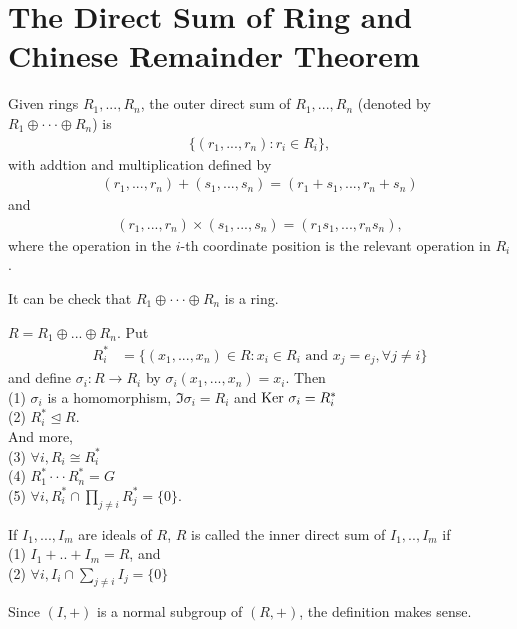 \chapter{The Direct Sum of Ring and Chinese Remainder Theorem}\label{chp:4_3}


\begin{definition}
    Given rings $R_1,...,R_n$, the outer direct sum of $R_1,...,R_n$ (denoted by $R_1\oplus\cdot\cdot\cdot\oplus R_n$) is
    \begin{align*}
        \{(r_1,...,r_n):r_i\in R_i\},
    \end{align*}
    with addtion and multiplication defined by 
    \begin{align*}
        (r_1,...,r_n) + (s_1,...,s_n) = (r_1+s_1,...,r_n+s_n)
    \end{align*}
    and 
    \begin{align*}
        (r_1,...,r_n)\times (s_1,...,s_n)=(r_1s_1,...,r_ns_n),
    \end{align*}
    where the operation in the $i$-th coordinate position is the relevant operation in $R_i$.
\end{definition}
It can be check that $R_1\oplus\cdot\cdot\cdot\oplus R_n$ is a ring.

\begin{theorem}{}{}
    $R = R_1\oplus ... \oplus R_n$. Put
    \begin{align*}
        R_i^* &= \{(x_1,...,x_n)\in R:x_i\in R_i\text{ and }x_j=e_j, \forall j\neq i\}
    \end{align*}
    and define $\sigma_i : R\rightarrow R_i$ by $\sigma_i(x_1,...,x_n)=x_i$. Then\\
    (1) $\sigma_i$ is a homomorphism, $\Im \sigma_i = R_i$ and $\text{Ker }\sigma_i = R_i^*$\\
    (2) $R_i^*\unlhd R$.\\
    And more, \\
    (3) $\forall i, R_i\cong R_i^*$\\
    (4) $R_1^*\cdot\cdot\cdot R_n^*=G$\\
    (5) $\forall i, R_i^*\cap \prod_{j\neq i}R_j^*=\{0\}$.
\end{theorem}

\begin{proposition}{}{}
    If $I_1,...,I_m$ are ideals of $R$, $R$ is called the inner direct sum of $I_1,..,I_m$ if\\
    (1) $I_1+..+I_m=R$, and\\
    (2) $\forall i, I_i\cap \sum\limits_{j\neq i}^{}I_j=\{0\}$
\end{proposition}
\begin{remark}
    Since $(I,+)$ is a normal subgroup of $(R,+)$, the definition makes sense.
\end{remark}

